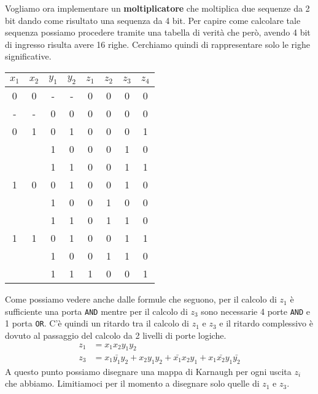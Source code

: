 Vogliamo ora implementare un \textbf{moltiplicatore} che moltiplica due sequenze da 2 bit dando
come risultato una sequenza da 4 bit. Per capire come calcolare tale sequenza possiamo procedere
tramite una tabella di verità che però, avendo 4 bit di ingresso risulta avere 16 righe. Cerchiamo
quindi di rappresentare solo le righe significative.
\begin{center}
	\begin{tabular}{c c c c | c c c c}
		$x_1$ & $x_2$ & $y_1$ & $y_2$ & $z_1$ & $z_2$ & $z_3$ & $z_4$ \\ \hline
		0     & 0     & -     & -     & 0     & 0     & 0     & 0     \\
		-     & -     & 0     & 0     & 0     & 0     & 0     & 0     \\ \hline
		0     & 1     & 0     & 1     & 0     & 0     & 0     & 1     \\
		      &       & 1     & 0     & 0     & 0     & 1     & 0     \\
		      &       & 1     & 1     & 0     & 0     & 1     & 1     \\ \hline
		1     & 0     & 0     & 1     & 0     & 0     & 1     & 0     \\
		      &       & 1     & 0     & 0     & 1     & 0     & 0     \\
		      &       & 1     & 1     & 0     & 1     & 1     & 0     \\ \hline
		1     & 1     & 0     & 1     & 0     & 0     & 1     & 1     \\
		      &       & 1     & 0     & 0     & 1     & 1     & 0     \\
		      &       & 1     & 1     & 1     & 0     & 0     & 1     \\
	\end{tabular}
\end{center}

Come possiamo vedere anche dalle formule che seguono, per il calcolo di $z_1$ è sufficiente una
porta \verb|AND| mentre per il calcolo di $z_3$ sono necessarie 4 porte \verb|AND| e 1 porta
\verb|OR|. C'è quindi un ritardo tra il calcolo di $z_1$ e $z_3$ e il ritardo complessivo è dovuto
al passaggio del calcolo da 2 livelli di porte logiche.
\begin{align*}
	z_1 & = x_1 x_2 y_1 y_2                                                                   \\
	z_3 & = x_1 \bar{y_1} y_2 + x_2 y_1 y_2 + \bar{x_1} x_2 y_1 + x_1 \bar{x_2} y_1 \bar{y_2}
\end{align*}
A questo punto possiamo disegnare una mappa di Karnaugh per ogni uscita $z_i$ che abbiamo.
Limitiamoci per il momento a disegnare solo quelle di $z_1$ e $z_3$.

